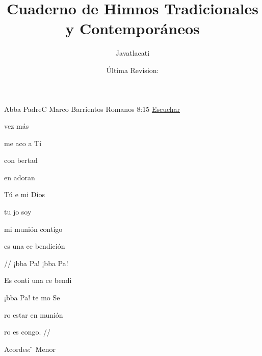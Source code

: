 \documentclass[12pt, spanish]{book}
\title{Cuaderno de Himnos Tradicionales y Contemporáneos}
\author{Javatlacati}
\date{\'Ultima Revision:  \RevDate}
\newcommand{\RevDate}{\today}
\newcommand{\NotCCLIed}{\relax}
\begin{document}
\maketitle

\mainmatter
\ifWordBk
  \twocolumn
\fi



\begin{song}{Abba Padre}{C}
  {} %
  {Marco Barrientos}
  {Romanos 8:15} %
  {\href{http://open.spotify.com/track/0yj0zBaa7Ckn6ZMQPmCmfF}{Escuchar}} %


  \begin{SBVerse}
 vez más

me aco a Tí

con bertad

en adoran
  \end{SBVerse}
  \begin{SBVerse}
Tú e mi Dios

tu jo soy

mi munión contigo

es una ce bendición
  \end{SBVerse}

  \begin{SBChorus}
// ¡bba Pa! ¡bba Pa!

Es conti  una ce bendi

¡bba Pa! te mo Se

ro estar en munión

ro es congo. //
  \end{SBChorus}
\ifChordBk
\begin{SBOpGroup}
    Acordes:
\keyboard[Do][Fso][Ao]\D\keyboard[Do][Go][Bo]\G



  Menor
  \end{SBOpGroup}
\fi
\end{song}
\end{document}

